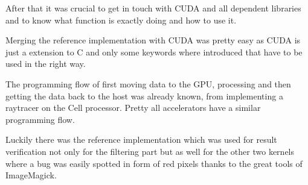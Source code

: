 After that it was crucial to get in touch with \gls{CUDA} and all dependent
libraries and to know what function is exactly doing and how to use it. 

Merging the reference implementation with \gls{CUDA} was pretty easy as \gls{CUDA}
is just a extension to C and only some keywords where introduced that have to 
be used in the right way. 

The programming flow of first moving data to the \gls{GPU}, processing and then
getting the data back to the host was already known, from implementing a raytracer
on the Cell processor. Pretty all accelerators have a similar programming flow. 

Luckily there was the reference implementation which was used for result verification
not only for the filtering part but as well for the other two kernels where a bug
was easily spotted in form of red pixels thanks to the great tools of ImageMagick.

















